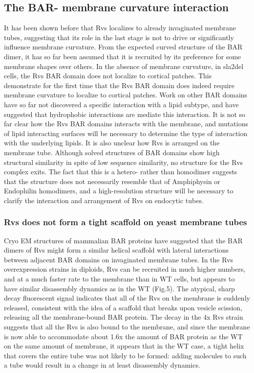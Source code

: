 \subsection{The BAR- membrane curvature interaction}
It has been shown before that Rvs localizes to already invaginated membrane tubes, suggesting that its role in the last stage is not to drive or significantly influence membrane curvature. From the expected curved structure of the BAR dimer, it has so far been assumed that it is recruited by its preference for some membrane shapes over others. In the absence of membrane curvature, in sla2del cells, the Rvs BAR domain does not localize to cortical patches. This demonstrate for the first time that the Rvs BAR domain does indeed require membrane curvature to localize to cortical patches. Work on other BAR domains have so far not discovered a specific interaction with a lipid subtype, and have suggested that hydrophobic interactions are mediate this interaction. It is not so far clear how the Rvs BAR domains interacts with the membrane, and mutations of lipid interacting surfaces will be necessary to determine the type of interaction with the underlying lipids. It is also unclear how Rvs is arranged on the membrane tube. Although solved structures of BAR domains show high structural similarity in spite of low sequence similarity, no structure for the Rvs complex exits. The fact that this is a hetero- rather than homodimer suggests that the structure does not necessarily resemble that of Amphiphysin or Endophilin homodimers, and a high-resolution structure will be necessary to clarify the interaction and arrangement of Rvs on endocytic tubes. 


\subsubsection{Rvs does not form a tight scaffold on yeast membrane tubes}
Cryo EM structures of mammalian BAR proteins have suggested that the BAR dimers of Rvs might form a similar helical scaffold with lateral interactions between adjacent BAR domains on invaginated membrane tubes. In the Rvs overexpression strains in diploids, Rvs can be recruited in much higher numbers, and at a much faster rate to the membrane than in WT cells, but appears to have similar disassembly dynamics as in the WT (Fig.5). The atypical, sharp decay fluorescent signal indicates that all of the Rvs on the membrane is suddenly released, consistent with the idea of a scaffold that breaks upon vesicle scission, releasing all the membrane-bound BAR protein. The decay in the 4x Rvs strain suggests that all the Rvs is also bound to the membrane, and since the membrane is now able to accommodate about 1.6x the amount of BAR protein as the WT on the same amount of membrane, it appears that in the WT case, a tight helix that covers the entire tube was not likely to be formed: adding molecules to such a tube would result in a change in at least disassembly dynamics.

